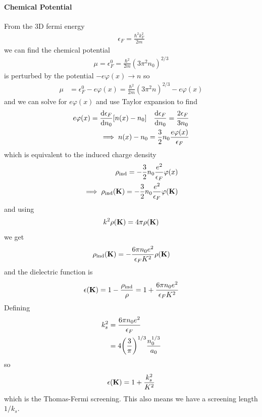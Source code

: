 \documentclass[../main.tex]{subfiles}
\begin{document}
\paragraph*{Chemical Potential}
From the 3D fermi energy
\begin{align*}
    \epsilon_F = \frac{\hbar^2 k_F^2}{2m}
\end{align*}
we can find the chemical potential
\begin{align*}
    \mu = \epsilon_F^0 = \frac{\hbar^2}{2m} (3\pi^2 n_0)^{2/3}
\end{align*}
is perturbed by the potential $-e\varphi(x) \to n$ so
\begin{align*}
    \mu &= \epsilon_F^0 - e\varphi(x) = \frac{\hbar^2}{2m} (3\pi^2 n)^{2/3} - e\varphi(x)
\end{align*}
and we can solve for $e\varphi(x)$ and use Taylor expansion to find
\begin{align*}
    e\varphi(x) = \dv{\epsilon_F}{n_0} [n(x) - n_0] \quad \dv{\epsilon_F}{n_0} = \frac{2\epsilon_F}{3n_0} \\
    \implies n(x) - n_0 = \frac{3}{2} n_0 \frac{e\varphi(x)}{\epsilon_F}
\end{align*}
which is equivalent to the induced charge density
\begin{align*}
    \rho_{\text{ind}} = -\frac{3}{2} n_0 \frac{e^2}{\epsilon_F} \varphi(x) \\
    \implies \rho_{\text{ind}}(\vb K) = -\frac{3}{2} n_0 \frac{e^2}{\epsilon_F} \varphi(\vb K)
\end{align*}
and using
\begin{align*}
    k^2 \rho(\vb K) = 4\pi \rho(\vb K)
\end{align*}
we get
\begin{align*}
    \rho_{\text{ind}}(\vb K) = -\frac{6\pi n_0 e^2}{\epsilon_F K^2} \rho(\vb K)
\end{align*}
and the dielectric function is
\begin{align*}
    \epsilon(\vb K) = 1 - \frac{\rho_{\text{ind}}}{\rho} = 1 + \frac{6\pi n_0 e^2}{\epsilon_F K^2}
\end{align*}
Defining
\begin{align*}
    k_s^2 &= \frac{6\pi n_0 e^2}{\epsilon_F} \\
        &= 4 \qt(\frac{3}{\pi})^{1/3} \frac{n_0^{1/3}}{a_0}
\end{align*}
so
\begin{align*}
    \epsilon(\vb K) = 1 + \frac{k_s^2}{K^2}
\end{align*}
which is the Thomas-Fermi screening. This also means we have a screening length $1/k_s$.
\end{document}
